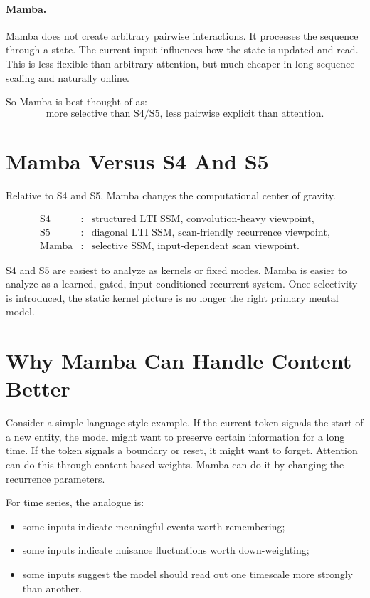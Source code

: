 \paragraph{Mamba.}
Mamba does not create arbitrary pairwise interactions. It processes the sequence through a
state. The current input influences how the state is updated and read. This is less
flexible than arbitrary attention, but much cheaper in long-sequence scaling and naturally
online.

So Mamba is best thought of as:
\[
  \text{more selective than S4/S5, less pairwise explicit than attention.}
\]

\section{Mamba Versus S4 And S5}

Relative to S4 and S5, Mamba changes the computational center of gravity.

\[
\begin{array}{lll}
\text{S4} &:& \text{structured LTI SSM, convolution-heavy viewpoint}, \\
\text{S5} &:& \text{diagonal LTI SSM, scan-friendly recurrence viewpoint}, \\
\text{Mamba} &:& \text{selective SSM, input-dependent scan viewpoint}.
\end{array}
\]

S4 and S5 are easiest to analyze as kernels or fixed modes. Mamba is easier to analyze as
a learned, gated, input-conditioned recurrent system. Once selectivity is introduced, the
static kernel picture is no longer the right primary mental model.

\section{Why Mamba Can Handle Content Better}

Consider a simple language-style example. If the current token signals the start of a new
entity, the model might want to preserve certain information for a long time. If the token
signals a boundary or reset, it might want to forget. Attention can do this through
content-based weights. Mamba can do it by changing the recurrence parameters.

For time series, the analogue is:

\begin{itemize}
  \item some inputs indicate meaningful events worth remembering;
  \item some inputs indicate nuisance fluctuations worth down-weighting;
  \item some inputs suggest the model should read out one timescale more strongly than
  another.
\end{itemize}

